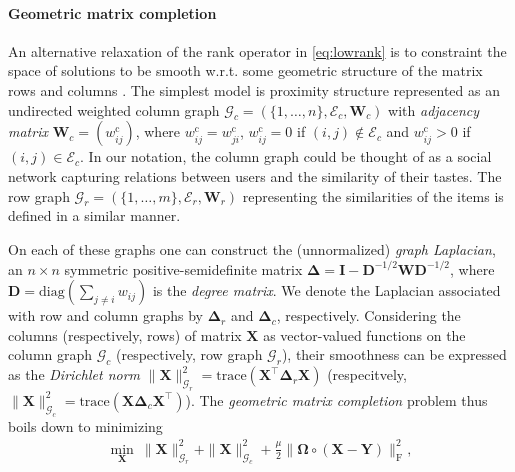 \documentclass{article}
\begin{document}
\paragraph*{Geometric matrix completion}
An alternative relaxation of the rank operator in \eqref{eq:lowrank} is to constraint the space of solutions to be smooth w.r.t. some geometric structure of the matrix rows and columns \cite{art:MaZhouLiuLyuKing11RecomSys,kalofolias2014matrix,rao2015collaborative,art:BenziKalofoliasBressonVandergheynst16NMFTV}. 
The simplest model is proximity structure represented as an undirected weighted column graph 
 $\mathcal{G}_c = (\{1,\hdots, n\}, \mathcal{E}_c, \mathbf{W}_c)$ with {\em adjacency matrix} $\mathbf{W}_c = (w^\mathrm{c}_{ij})$, where $w^\mathrm{c}_{ij} = w^\mathrm{c}_{ji}$, $w^\mathrm{c}_{ij} = 0$ if $(i,j) \notin \mathcal{E}_c$ and $w^\mathrm{c}_{ij} > 0$ if $(i,j) \in \mathcal{E}_c$. 
In our notation, the column graph could be thought of as a social network capturing relations between users and the similarity of their tastes. 
The row graph  $\mathcal{G}_r = (\{1,\hdots, m\}, \mathcal{E}_r, \mathbf{W}_r )$ representing the similarities of the items is defined in a similar manner. 
 
 
On each of these graphs one can construct the (unnormalized) {\em graph Laplacian}, an $n\times n$ symmetric positive-semidefinite matrix $\boldsymbol{\Delta} = \mathbf{I} - \mathbf{D}^{-1/2} \mathbf{W} \mathbf{D}^{-1/2}$, where $\mathbf{D} = \mathrm{diag}\left(\sum_{j\neq i} w_{ij} \right)$ is the {\em degree matrix}. We denote the Laplacian associated with row and column graphs by $\boldsymbol{\Delta}_r$ and $\boldsymbol{\Delta}_c$, respectively. 
Considering the columns (respectively, rows) of matrix $\mathbf{X}$ as vector-valued functions on the column graph $\mathcal{G}_c$ (respectively, row graph $\mathcal{G}_r$), their smoothness can be expressed as the {\em Dirichlet norm} 
$\| \mathbf{X} \|_{\mathcal{G}_{r}}^2=\mathrm{trace}(\mathbf{X}^\top \boldsymbol{\Delta}_r \mathbf{X})$ (respecitvely, $\| \mathbf{X} \|_{\mathcal{G}_{c}}^2=\mathrm{trace}(\mathbf{X} \boldsymbol{\Delta}_c \mathbf{X}^\top)$). 
The {\em geometric matrix completion} problem thus boils down to minimizing 
 \begin{eqnarray}
\min_\mathbf{X} \ \| \mathbf{X} \|_{\mathcal{G}_r}^2 + \| \mathbf{X} \|_{\mathcal{G}_c}^2 + \frac{\mu}{2} \| \boldsymbol{\Omega} \circ (\mathbf{X} - \mathbf{Y}) \|_\mathrm{F}^2,
\label{eq:Dir}
\end{eqnarray}
\end{document}
